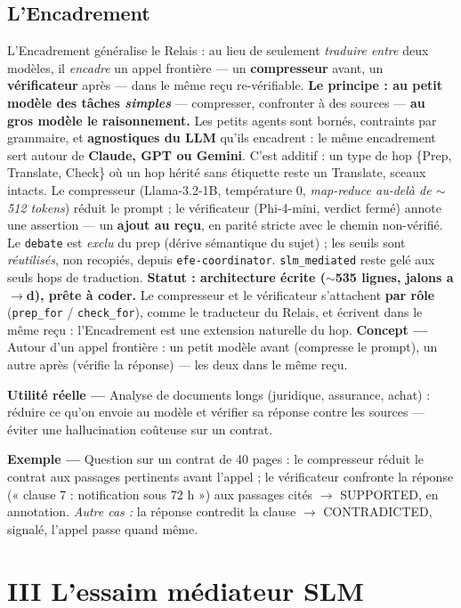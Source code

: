\documentclass[11pt]{article}
\newcommand{\concept}[1]{{\color{efenavy}\textbf{Concept —} }#1\par}
\newcommand{\exemple}[1]{{\color{efeamber}\textbf{Exemple —} }#1\par}
\newcommand{\utilite}[1]{{\color{efeplum}\textbf{Utilité réelle —} }#1\par}
\begin{document}
\subsection{L'Encadrement}
L'Encadrement généralise le Relais : au lieu de seulement \emph{traduire entre} deux modèles, il
\emph{encadre} un appel frontière — un \textbf{compresseur} avant, un \textbf{vérificateur}
après — dans le même reçu re-vérifiable. \textbf{Le principe : au petit modèle des tâches
\emph{simples}} — compresser, confronter à des sources — \textbf{au gros modèle le
raisonnement.} Les petits agents sont bornés, contraints par grammaire, et \textbf{agnostiques
du LLM} qu'ils encadrent : le même encadrement sert autour de \textbf{Claude, GPT ou Gemini}.
C'est additif : un type de hop
\{Prep, Translate, Check\} où un hop hérité sans étiquette reste un Translate, sceaux intacts.
Le compresseur (Llama-3.2-1B, température 0, \emph{map-reduce au-delà de $\sim$512 tokens})
réduit le prompt ; le vérificateur (Phi-4-mini, verdict fermé) annote une assertion — un
\textbf{ajout au reçu}, en parité stricte avec le chemin non-vérifié. Le \texttt{debate} est
\emph{exclu} du prep (dérive sémantique du sujet) ; les seuils sont \emph{réutilisés}, non
recopiés, depuis \texttt{efe-coordinator}. \texttt{slm\_mediated} reste gelé aux seuls hops de
traduction.
\textbf{Statut : architecture écrite ($\sim$535 lignes, jalons a$\rightarrow$d), prête à coder.}
Le compresseur et le vérificateur s'attachent \textbf{par rôle} (\texttt{prep\_for} /
\texttt{check\_for}), comme le traducteur du Relais, et écrivent dans le même reçu : l'Encadrement
est une extension naturelle du hop.
\concept{Autour d'un appel frontière : un petit modèle avant (compresse le prompt), un autre
après (vérifie la réponse) — les deux dans le même reçu.}
\utilite{Analyse de documents longs (juridique, assurance, achat) : réduire ce qu'on envoie au
modèle et vérifier sa réponse contre les sources — éviter une hallucination coûteuse sur un contrat.}
\exemple{Question sur un contrat de 40 pages : le compresseur réduit le contrat aux passages
pertinents avant l'appel ; le vérificateur confronte la réponse (« clause 7 : notification sous
72 h ») aux passages cités $\rightarrow$ SUPPORTED, en annotation. \emph{Autre cas :} la réponse
contredit la clause $\rightarrow$ CONTRADICTED, signalé, l'appel passe quand même.}

\section{III \;\textbar\; L'essaim médiateur SLM}
\end{document}
